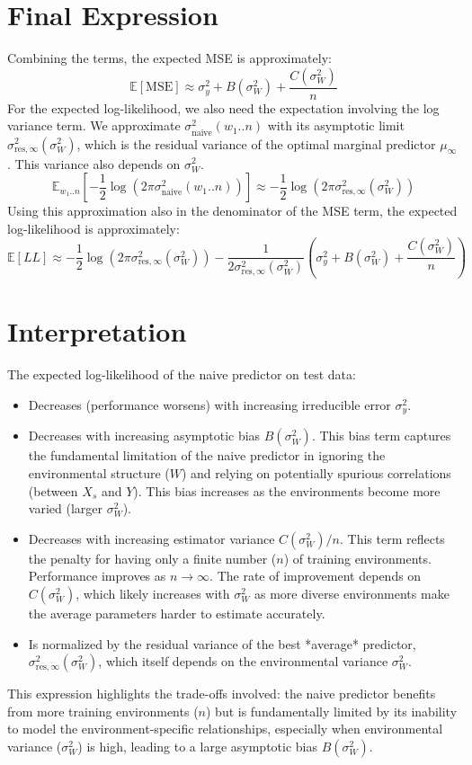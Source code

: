 \documentclass{article}
\begin{document}
\section{Final Expression}

Combining the terms, the expected MSE is approximately:
\[ \mathbb{E}[\text{MSE}] \approx \sigma_y^2 + B(\sigma_W^2) + \frac{C(\sigma_W^2)}{n} \]
For the expected log-likelihood, we also need the expectation involving the log variance term. We approximate $\sigma_{\text{naive}}^2(w_1..n)$ with its asymptotic limit $\sigma_{\text{res},\infty}^2(\sigma_W^2)$, which is the residual variance of the optimal marginal predictor $\mu_\infty$. This variance also depends on $\sigma_W^2$.
\[ \mathbb{E}_{w_1..n} \left[ -\frac{1}{2} \log(2\pi \sigma_{\text{naive}}^2(w_1..n)) \right] \approx -\frac{1}{2} \log(2\pi \sigma_{\text{res},\infty}^2(\sigma_W^2)) \]
Using this approximation also in the denominator of the MSE term, the expected log-likelihood is approximately:
\begin{equation} \label{eq:final_ell}
\mathbb{E}[LL] \approx -\frac{1}{2} \log(2\pi \sigma_{\text{res},\infty}^2(\sigma_W^2)) - \frac{1}{2 \sigma_{\text{res},\infty}^2(\sigma_W^2)} \left( \sigma_y^2 + B(\sigma_W^2) + \frac{C(\sigma_W^2)}{n} \right)
\end{equation}

\section{Interpretation}

The expected log-likelihood of the naive predictor on test data:
\begin{itemize}
    \item Decreases (performance worsens) with increasing irreducible error $\sigma_y^2$.
    \item Decreases with increasing asymptotic bias $B(\sigma_W^2)$. This bias term captures the fundamental limitation of the naive predictor in ignoring the environmental structure ($W$) and relying on potentially spurious correlations (between $X_s$ and $Y$). This bias increases as the environments become more varied (larger $\sigma_W^2$).
    \item Decreases with increasing estimator variance $C(\sigma_W^2)/n$. This term reflects the penalty for having only a finite number ($n$) of training environments. Performance improves as $n \to \infty$. The rate of improvement depends on $C(\sigma_W^2)$, which likely increases with $\sigma_W^2$ as more diverse environments make the average parameters harder to estimate accurately.
    \item Is normalized by the residual variance of the best *average* predictor, $\sigma_{\text{res},\infty}^2(\sigma_W^2)$, which itself depends on the environmental variance $\sigma_W^2$.
\end{itemize}
This expression highlights the trade-offs involved: the naive predictor benefits from more training environments ($n$) but is fundamentally limited by its inability to model the environment-specific relationships, especially when environmental variance ($\sigma_W^2$) is high, leading to a large asymptotic bias $B(\sigma_W^2)$.
\end{document}
